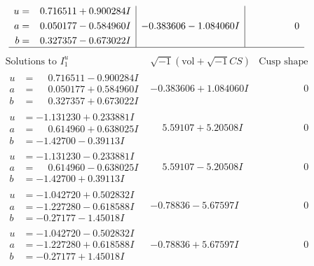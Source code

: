 \documentclass[1p]{elsarticle_modified}
\theoremstyle{definition}
\newcommand{\I}{\sqrt{-1}}
\begin{document}
$$\begin{array}{c|c|c}
\begin{aligned}
u &= \phantom{-}0.716511 + 0.900284 I \\
a &= \phantom{-}0.050177 - 0.584960 I \\
b &= \phantom{-}0.327357 - 0.673022 I\end{aligned}
 & -0.383606 - 1.084060 I & \phantom{-0.000000 } 0\\
 \hline 
 \end{array}$$\newpage$$\begin{array}{c|c|c}  
\text{Solutions to }I^u_{1}& \I (\text{vol} + \sqrt{-1}CS) & \text{Cusp shape}\\
 \hline 
\begin{aligned}
u &= \phantom{-}0.716511 - 0.900284 I \\
a &= \phantom{-}0.050177 + 0.584960 I \\
b &= \phantom{-}0.327357 + 0.673022 I\end{aligned}
 & -0.383606 + 1.084060 I & \phantom{-0.000000 } 0 \\ \hline\begin{aligned}
u &= -1.131230 + 0.233881 I \\
a &= \phantom{-}0.614960 + 0.638025 I \\
b &= -1.42700 - 0.39113 I\end{aligned}
 & \phantom{-}5.59107 + 5.20508 I & \phantom{-0.000000 } 0 \\ \hline\begin{aligned}
u &= -1.131230 - 0.233881 I \\
a &= \phantom{-}0.614960 - 0.638025 I \\
b &= -1.42700 + 0.39113 I\end{aligned}
 & \phantom{-}5.59107 - 5.20508 I & \phantom{-0.000000 } 0 \\ \hline\begin{aligned}
u &= -1.042720 + 0.502832 I \\
a &= -1.227280 - 0.618588 I \\
b &= -0.27177 - 1.45018 I\end{aligned}
 & -0.78836 - 5.67597 I & \phantom{-0.000000 } 0 \\ \hline\begin{aligned}
u &= -1.042720 - 0.502832 I \\
a &= -1.227280 + 0.618588 I \\
b &= -0.27177 + 1.45018 I\end{aligned}
 & -0.78836 + 5.67597 I & \phantom{-0.000000 } 0 \\ \hline\begin{aligned}

\end{aligned}
\end{array}$$
\end{document}
